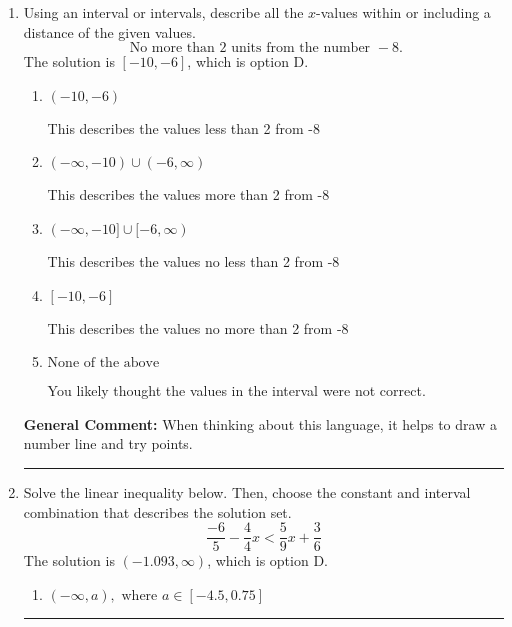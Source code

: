 \documentclass{extbook}[14pt]
\newcommand{\litem}[1]{\item #1

\rule{\textwidth}{0.4pt}}
\begin{document}
\begin{enumerate}
{\begin{enumerate}[label=\Alph*.]
$[-10.33, 1.83)$, which corresponds to flipping the inequality.
\item \( (-\infty, a) \cup [b, \infty), \text{ where } a \in [-13.5, -6] \text{ and } b \in [1.5, 2.25] \)

$(-\infty, -10.33) \cup [1.83, \infty)$, which corresponds to displaying the and-inequality as an or-inequality.
\item \( (-\infty, a] \cup (b, \infty), \text{ where } a \in [-12, -6.75] \text{ and } b \in [1.2, 2.7] \)

$(-\infty, -10.33] \cup (1.83, \infty)$, which corresponds to displaying the and-inequality as an or-inequality AND flipping the inequality.
\item \( (a, b], \text{ where } a \in [-12, -9.75] \text{ and } b \in [-1.5, 6] \)

* $(-10.33, 1.83]$, which is the correct option.
\item \( \text{None of the above.} \)


\end{enumerate}

\textbf{General Comment:} To solve, you will need to break up the compound inequality into two inequalities. Be sure to keep track of the inequality! It may be best to draw a number line and graph your solution.
}
\litem{
Using an interval or intervals, describe all the $x$-values within or including a distance of the given values.
\[ \text{ No more than } 2 \text{ units from the number } -8. \]The solution is \( [-10, -6] \), which is option D.\begin{enumerate}[label=\Alph*.]
\item \( (-10, -6) \)

This describes the values less than 2 from -8
\item \( (-\infty, -10) \cup (-6, \infty) \)

This describes the values more than 2 from -8
\item \( (-\infty, -10] \cup [-6, \infty) \)

This describes the values no less than 2 from -8
\item \( [-10, -6] \)

This describes the values no more than 2 from -8
\item \( \text{None of the above} \)

You likely thought the values in the interval were not correct.
\end{enumerate}

\textbf{General Comment:} When thinking about this language, it helps to draw a number line and try points.
}
\litem{
Solve the linear inequality below. Then, choose the constant and interval combination that describes the solution set.
\[ \frac{-6}{5} - \frac{4}{4} x < \frac{5}{9} x + \frac{3}{6} \]The solution is \( (-1.093, \infty) \), which is option D.\begin{enumerate}[label=\Alph*.]
\item \( (-\infty, a), \text{ where } a \in [-4.5, 0.75] \)


\end{enumerate}}
\end{enumerate}
\end{document}
